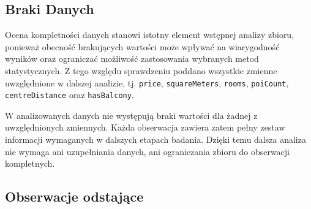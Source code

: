 \documentclass{report}
\begin{document}





\subsection{Braki Danych}


Ocena kompletności danych stanowi istotny element wstępnej analizy zbioru, ponieważ obecność brakujących wartości może wpływać na wiarygodność wyników oraz ograniczać możliwość zastosowania wybranych metod statystycznych. Z tego względu sprawdzeniu poddano wszystkie zmienne uwzględnione w dalszej analizie, tj. \texttt{price}, \texttt{squareMeters}, \texttt{rooms}, \texttt{poiCount}, \texttt{centreDistance} oraz \texttt{hasBalcony}.

W analizowanych danych nie występują braki wartości dla żadnej z uwzględnionych zmiennych. Każda obserwacja zawiera zatem pełny zestaw informacji wymaganych w dalszych etapach badania. Dzięki temu dalsza analiza nie wymaga ani uzupełniania danych, ani ograniczania zbioru do obserwacji kompletnych.

\subsection{Obserwacje odstające}
\end{document}
